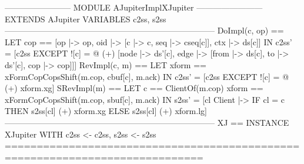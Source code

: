 \documentclass{article}
\begin{document}
\begin{tla}
------------------------ MODULE AJupiterImplXJupiter ------------------------
EXTENDS AJupiter
VARIABLES c2ss, s2ss
-----------------------------------------------------------------------------
DoImpl(c, op) == LET cop == [op |-> op, oid |-> [c |-> c, seq |-> cseq[c]], ctx |-> ds[c]]
                 IN  c2ss' = [c2ss EXCEPT ![c] = 
                       @ (+) [node |-> {ds'[c]},
                              edge |-> {[from |-> ds[c], to |-> ds'[c], cop |-> cop]}]]
RevImpl(c, m) == LET xform == xFormCopCopsShift(m.cop, cbuf[c], m.ack)
                 IN  c2ss' = [c2ss EXCEPT ![c] = @ (+) xform.xg]
SRevImpl(m) == LET c == ClientOf(m.cop)
               xform == xFormCopCopsShift(m.cop, sbuf[c], m.ack)
               IN  s2ss' = [cl \in Client |-> IF cl = c THEN s2ss[cl] (+) xform.xg
                                                        ELSE s2ss[cl] (+) xform.lg]
-----------------------------------------------------------------------------
XJ == INSTANCE XJupiter WITH c2ss <- c2ss, s2ss <- s2ss
=============================================================================
\end{tla}
\end{document}

